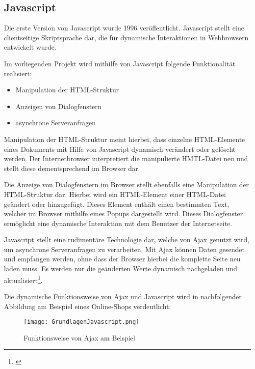 \subsection{Javascript}
\label{sec:Javascript}

Die erste Version von Javascript wurde 1996 veröffentlicht. Javascript stellt
eine clientseitige Skriptsprache dar, die für dynamische Interaktionen in
Webbrowsern entwickelt wurde.

Im vorliegenden Projekt wird mithilfe von Javascript folgende Funktionalität
realisiert:

\begin{itemize}
  \item Manipulation der HTML-Struktur
  \item Anzeigen von Dialogfenstern
  \item asynchrone Serveranfragen
\end{itemize}

Manipulation der HTML-Struktur meint hierbei, dass einzelne HTML-Elemente eines
Dokuments mit Hilfe von Javascript dynamisch verändert oder gelöscht werden.
Der Internetbrowser interpretiert die manipulierte HMTL-Datei neu und stellt
diese dementsprechend im Browser dar.

Die Anzeige von Dialogfenstern im Browser stellt ebenfalls eine Manipulation
der HTML-Struktur dar. Hierbei wird ein HTML-Element einer HTML-Datei geändert
oder hinzugefügt. Dieses Element enthält einen bestimmten Text, welcher im
Browser mithilfe eines Popups dargestellt wird. Dieses Dialogfenster ermöglicht
eine dynamische Interaktion mit dem Benutzer der Internetseite.

Javascript stellt eine rudimentäre Technologie dar, welche von Ajax genutzt
wird, um asynchrone Serveranfragen zu verarbeiten. Mit Ajax können Daten
gesendet und empfangen werden, ohne dass der Browser hierbei die komplette Seite
neu laden muss. Es werden nur die geänderten Werte dynamisch nachgeladen und
aktualisiert\footnote{\citet[S.~104]{heinle2006}}.

Die dynamische Funktionsweise von Ajax und Javascript wird in nachfolgender
Abbildung am Beispiel eines Online-Shops verdeutlicht:

\begin{figure}[htb]
\centering
\texttt{[image: GrundlagenJavascript.png]}
\caption[Grundlagen Javascript]{Funktionsweise von Ajax am Beispiel\protect\footnotemark}
\label{fig:GrundlagendJavascript}
\end{figure}
